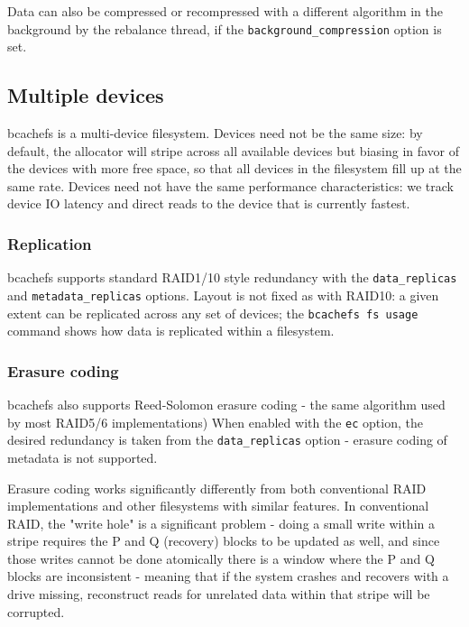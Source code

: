 \documentclass{article}
\begin{document}
Data can also be compressed or recompressed with a different algorithm in the
background by the rebalance thread, if the \texttt{background\_compression}
option is set.

\subsection{Multiple devices}

bcachefs is a multi-device filesystem. Devices need not be the same size: by
default, the allocator will stripe across all available devices but biasing in
favor of the devices with more free space, so that all devices in the filesystem
fill up at the same rate. Devices need not have the same performance
characteristics: we track device IO latency and direct reads to the device that
is currently fastest.

\subsubsection{Replication}

bcachefs supports standard RAID1/10 style redundancy with the
\texttt{data\_replicas} and \texttt{metadata\_replicas} options. Layout is not
fixed as with RAID10: a given extent can be replicated across any set of
devices; the \texttt{bcachefs fs usage} command shows how data is replicated
within a filesystem.

\subsubsection{Erasure coding}

bcachefs also supports Reed-Solomon erasure coding - the same algorithm used by
most RAID5/6 implementations) When enabled with the \texttt{ec} option, the
desired redundancy is taken from the \texttt{data\_replicas} option - erasure
coding of metadata is not supported.

Erasure coding works significantly differently from both conventional RAID
implementations and other filesystems with similar features. In conventional
RAID, the "write hole" is a significant problem - doing a small write within a
stripe requires the P and Q (recovery) blocks to be updated as well, and since
those writes cannot be done atomically there is a window where the P and Q
blocks are inconsistent - meaning that if the system crashes and recovers with a
drive missing, reconstruct reads for unrelated data within that stripe will be
corrupted.
\end{document}
